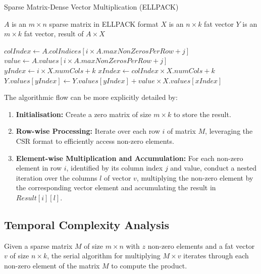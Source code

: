 \documentclass[12pt,oneside]{book} %
\begin{document}
\begin{algorithm}[H]
    \caption{Sparse Matrix-Dense Vector Multiplication (ELLPACK)}
    \begin{algorithmic}
        \Require $A$ is an $m \times n$ sparse matrix in ELLPACK format
        \Require $X$ is an $n \times k$ fat vector
        \Ensure  $Y$ is an $m \times k$ fat vector, result of $A \times X$

        \State $colIndex \gets A.colIndices[i \times A.maxNonZerosPerRow + j]$
        \State $value \gets A.values[i \times A.maxNonZerosPerRow + j]$
        \State $yIndex \gets i \times X.numCols + k$
        \State $xIndex \gets colIndex \times X.numCols + k$
        \State $Y.values[yIndex] \gets Y.values[yIndex] + value \times X.values[xIndex]$
        \EndFor
        \EndIf
        \EndFor
        \EndFor
    \end{algorithmic}
\end{algorithm}

The algorithmic flow can be more explicitly detailed by:
\begin{enumerate}
    \item \textbf{Initialisation:} Create a zero matrix of size \( m \times k \) to store the result.
    \item \textbf{Row-wise Processing:} Iterate over each row \(i\) of matrix \(M\), leveraging the CSR format to efficiently access non-zero elements.
    \item \textbf{Element-wise Multiplication and Accumulation:} For each non-zero element in row \(i\), identified by its column index \(j\) and value, conduct a nested iteration over the columns \(l\) of vector \(v\), multiplying the non-zero element by the corresponding vector element and accumulating the result in \(Result[i][l]\).
\end{enumerate}

\subsection{Temporal Complexity Analysis}

Given a sparse matrix $M$ of size $m \times n$ with $z$ non-zero elements and a
fat vector $v$ of size $n \times k$, the serial algorithm for multiplying \(M
\times v\) iterates through each non-zero element of the matrix \(M\) to
compute the product.
\end{document}
